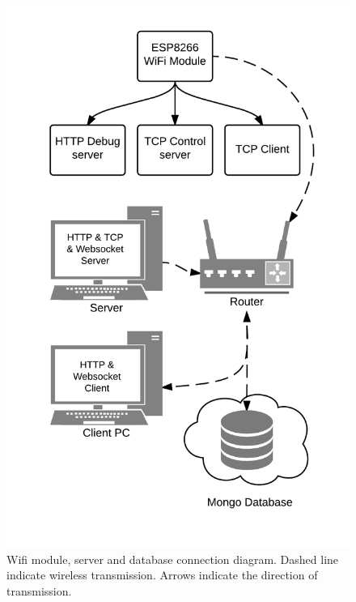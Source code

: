 \begin{figure}[p]
    \centering
    \includegraphics[width=\linewidth]{server}
    \caption{Wifi module, server and database connection diagram. Dashed line indicate wireless transmission. Arrows indicate the direction of transmission.}
    \label{fig:arduino}
\end{figure}


